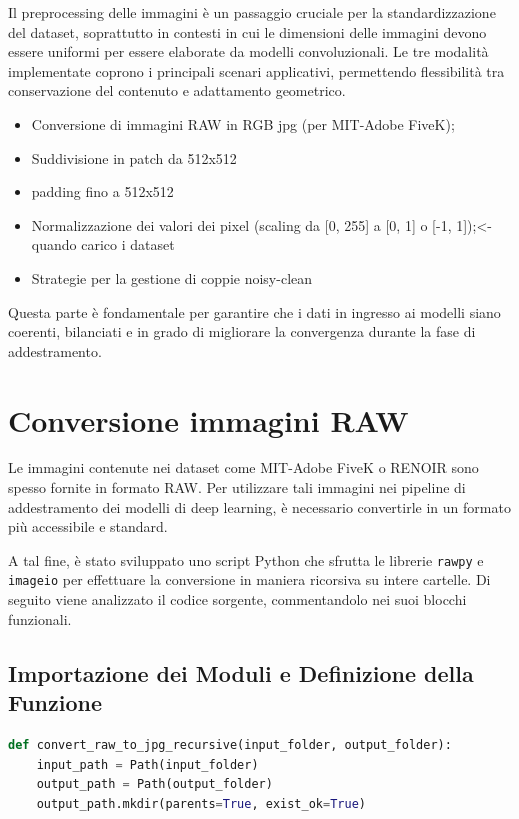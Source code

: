 \documentclass[12pt,a4paper,openright,twoside]{book}
\begin{document}
Il preprocessing delle immagini è un passaggio cruciale per la standardizzazione del dataset, soprattutto in contesti in cui le dimensioni delle immagini devono essere uniformi per essere elaborate da modelli convoluzionali. Le tre modalità implementate coprono i principali scenari applicativi, permettendo flessibilità tra conservazione del contenuto e adattamento geometrico.

\begin{itemize}
  \item Conversione di immagini RAW in RGB jpg (per MIT-Adobe FiveK);
  \item Suddivisione in patch da 512x512
  \item padding fino a 512x512
  \item Normalizzazione dei valori dei pixel (scaling da [0, 255] a [0, 1] o [-1, 1]);<-quando carico i dataset
  \item Strategie per la gestione di coppie noisy-clean 
\end{itemize}

Questa parte è fondamentale per garantire che i dati in ingresso ai modelli siano coerenti, bilanciati e in grado di migliorare la convergenza durante la fase di addestramento.

\section{Conversione immagini RAW}
Le immagini contenute nei dataset come MIT-Adobe FiveK o RENOIR sono spesso fornite in formato RAW. Per utilizzare tali immagini nei pipeline di addestramento dei modelli di deep learning, è necessario convertirle in un formato più accessibile e standard.

A tal fine, è stato sviluppato uno script Python che sfrutta le librerie \texttt{rawpy} e \texttt{imageio} per effettuare la conversione in maniera ricorsiva su intere cartelle. Di seguito viene analizzato il codice sorgente, commentandolo nei suoi blocchi funzionali.
\newpage
\subsection*{Importazione dei Moduli e Definizione della Funzione}

\begin{lstlisting}[language=Python, caption={Conversione immagini raw a jpg}, label={lst:raw-to-jpg}]
def convert_raw_to_jpg_recursive(input_folder, output_folder):
    input_path = Path(input_folder)
    output_path = Path(output_folder)
    output_path.mkdir(parents=True, exist_ok=True)
\end{lstlisting}
\end{document}

